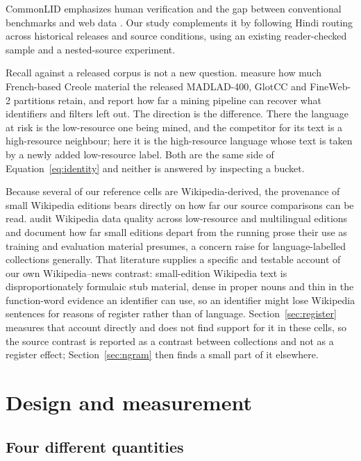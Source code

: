 \documentclass[final]{clv2025}
\begin{document}
CommonLID emphasizes human verification and the gap between conventional benchmarks and web data \citep{ortizsuarez-etal-2026-commonlid}. Our study complements it by following Hindi routing across historical releases and source conditions, using an existing reader-checked sample and a nested-source experiment.

Recall against a released corpus is not a new question. \citet{dent-etal-2025-identifying} measure how much French-based Creole material the released MADLAD-400, GlotCC and FineWeb-2 partitions retain, and report how far a mining pipeline can recover what identifiers and filters left out. The direction is the difference. There the language at risk is the low-resource one being mined, and the competitor for its text is a high-resource neighbour; here it is the high-resource language whose text is taken by a newly added low-resource label. Both are the same side of Equation~\ref{eq:identity} and neither is answered by inspecting a bucket.

Because several of our reference cells are Wikipedia-derived, the provenance of small Wikipedia editions bears directly on how far our source comparisons can be read. \citet{tatariya-etal-2026-good} audit Wikipedia data quality across low-resource and multilingual editions and document how far small editions depart from the running prose their use as training and evaluation material presumes, a concern \citet{kreutzer-etal-2022-quality} raise for language-labelled collections generally. That literature supplies a specific and testable account of our own Wikipedia--news contrast: small-edition Wikipedia text is disproportionately formulaic stub material, dense in proper nouns and thin in the function-word evidence an identifier can use, so an identifier might lose Wikipedia sentences for reasons of register rather than of language. Section~\ref{sec:register} measures that account directly and does not find support for it in these cells, so the source contrast is reported as a contrast between collections and not as a register effect; Section~\ref{sec:ngram} then finds a small part of it elsewhere.
\section{Design and measurement}\label{sec:design}

\subsection{Four different quantities}
\end{document}
